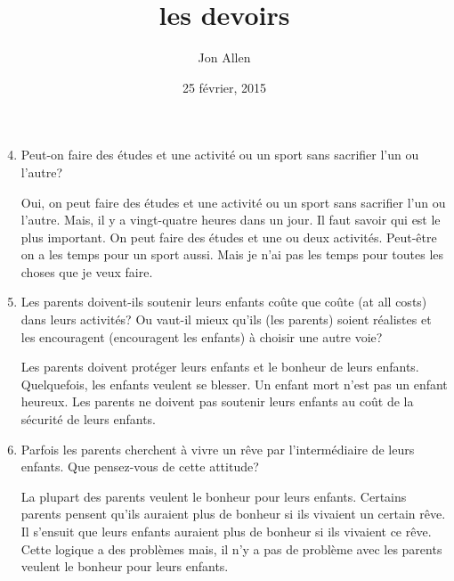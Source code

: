 \documentclass[letterpaper]{article}
\begin{document}
\title{les devoirs}
\date{25 février, 2015}
\author{Jon Allen}
\maketitle
\doublespacing
\begin{enumerate}
\setcounter{enumi}{3}
\item
Peut-on faire des études et une activité ou un sport sans sacrifier l'un ou l'autre?

Oui, on peut faire des études et une activité ou un sport sans sacrifier l'un ou l'autre. Mais, il y a vingt-quatre heures dans un jour. Il faut savoir qui est le plus important. On peut faire des études et une ou deux activités. Peut-être on a les temps pour un sport aussi. Mais je n'ai pas les temps pour toutes les choses que je veux faire.
\item
Les parents doivent-ils soutenir leurs enfants coûte que coûte (at all costs) dans leurs activités?  Ou vaut-il mieux qu'ils (les parents) soient réalistes et les encouragent (encouragent les enfants) à choisir une autre voie?

Les parents doivent protéger leurs enfants et le bonheur de leurs enfants. Quelquefois, les enfants veulent se blesser. Un enfant mort n'est pas un enfant heureux. Les parents ne doivent pas soutenir leurs enfants au coût de la sécurité de leurs enfants.
\item
Parfois les parents cherchent à vivre un rêve par l'intermédiaire de leurs enfants.  Que pensez-vous de cette attitude?

La plupart des parents veulent le bonheur pour leurs enfants. Certains parents pensent qu'ils auraient plus de bonheur si ils vivaient un certain rêve. Il s'ensuit que leurs enfants auraient plus de bonheur si ils vivaient ce rêve. Cette logique a des problèmes mais, il n'y a pas de problème avec les parents veulent le bonheur pour leurs enfants.
\end{enumerate}
\end{document}
